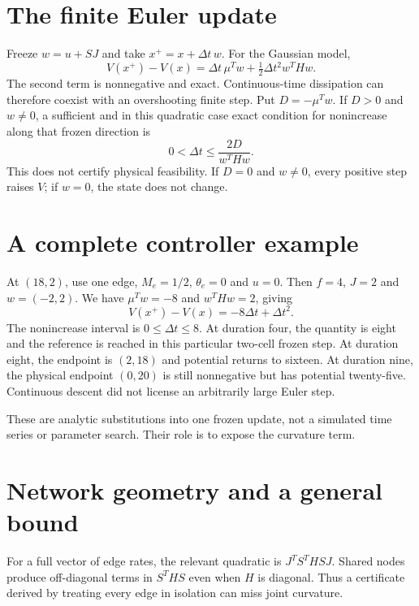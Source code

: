 \section{The finite Euler update}
Freeze $w=u+SJ$ and take $x^+=x+\Delta t\,w$. For the Gaussian model,
\begin{equation}
 V(x^+)-V(x)=\Delta t\,\mu^Tw+
                   \tfrac12\Delta t^2w^THw.
\end{equation}
The second term is nonnegative and exact. Continuous-time dissipation can
therefore coexist with an overshooting finite step. Put
$D=-\mu^Tw$. If $D>0$ and $w\ne0$, a sufficient and in this quadratic
case exact condition for nonincrease along that frozen direction is
\begin{equation}
 0<\Delta t\leq\frac{2D}{w^THw}.
\end{equation}
This does not certify physical feasibility. If $D=0$ and $w\ne0$, every
positive step raises $V$; if $w=0$, the state does not change.

\section{A complete controller example}
At $(18,2)$, use one edge, $M_e=1/2$, $\theta_e=0$ and $u=0$.
Then $f=4$, $J=2$ and $w=(-2,2)$. We have $\mu^Tw=-8$ and
$w^THw=2$, giving
\begin{equation}
 V(x^+)-V(x)=-8\Delta t+\Delta t^2.
\end{equation}
The nonincrease interval is $0\leq\Delta t\leq8$. At duration four,
the quantity is eight and the reference is reached in this particular
two-cell frozen step. At duration eight, the endpoint is $(2,18)$ and
potential returns to sixteen. At duration nine, the physical endpoint
$(0,20)$ is still nonnegative but has potential twenty-five. Continuous
descent did not license an arbitrarily large Euler step.

These are analytic substitutions into one frozen update, not a simulated
time series or parameter search. Their role is to expose the curvature term.

\section{Network geometry and a general bound}
For a full vector of edge rates, the relevant quadratic is
$J^TS^THSJ$. Shared nodes produce off-diagonal terms in $S^THS$ even
when $H$ is diagonal. Thus a certificate derived by treating every edge in
isolation can miss joint curvature.

